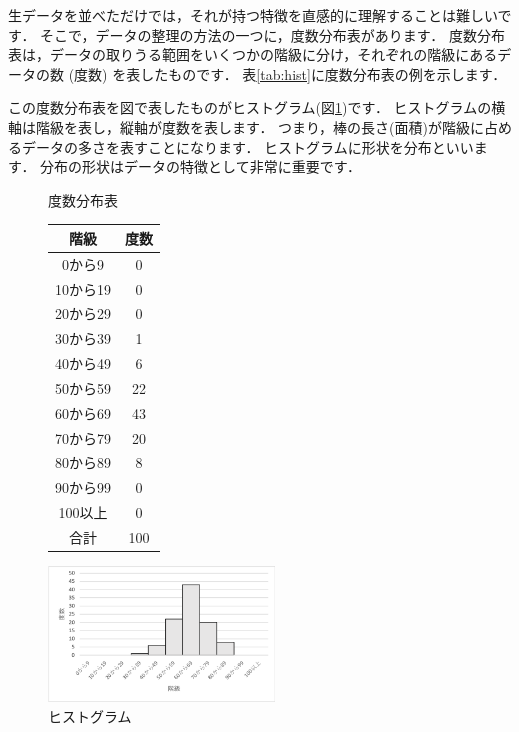 生データを並べただけでは，それが持つ特徴を直感的に理解することは難しいです．
そこで，データの整理の方法の一つに，度数分布表があります．
度数分布表は，データの取りうる範囲をいくつかの階級に分け，それぞれの階級にあるデータの数 (度数) を表したものです．
表\ref{tab:hist}に度数分布表の例を示します．

この度数分布表を図で表したものがヒストグラム(図\ref{fig:histogram})です．
ヒストグラムの横軸は階級を表し，縦軸が度数を表します．
つまり，棒の長さ(面積)が階級に占めるデータの多さを表すことになります．
ヒストグラムに形状を分布といいます．
分布の形状はデータの特徴として非常に重要です．

\begin{figure}[tb]
    \begin{minipage}{0.5\hsize}
        \makeatletter
        \def\@captype{table}
        \makeatother
        \centering
        \caption{度数分布表}
        \begin{tabular}{c|c}
          階級      & 度数 \\ \hline
          0から9    & 0 \\
          10から19  & 0 \\
          20から29  & 0 \\
          30から39  & 1 \\
          40から49  & 6 \\
          50から59  & 22\\
          60から69  & 43\\
          70から79  & 20\\
          80から89  & 8 \\
          90から99  & 0 \\
          100以上       & 0 \\
          合計          & 100
        \end{tabular}
        \label{tab:hist}
    \end{minipage}
    \begin{minipage}{0.5\hsize}
        \centering
        \includegraphics[width=6cm]{chap1/hist.png}
        \caption{ヒストグラム}
        \label{fig:histogram}
    \end{minipage}
\end{figure}

